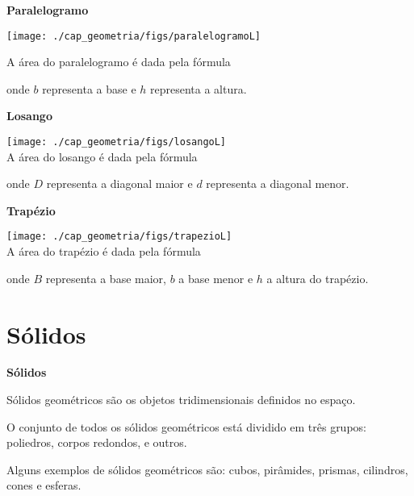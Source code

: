 \textbf{Paralelogramo}
\begin{multicols}{2}
\texttt{[image: ./cap\_geometria/figs/paralelogramoL]}

A área do paralelogramo é dada pela fórmula


onde $b$ representa a base e $h$ representa a altura.
\end{multicols}

\newpage

\textbf{Losango}
\begin{multicols}{2}
\texttt{[image: ./cap\_geometria/figs/losangoL]} \\
A área do losango é dada pela fórmula


onde $D$ representa a diagonal maior e $d$ representa a diagonal menor.
\end{multicols}

\textbf{Trapézio}
\begin{multicols}{2}
\texttt{[image: ./cap\_geometria/figs/trapezioL]} \\
A área do trapézio é dada pela fórmula


onde $B$ representa a base maior, $b$ a base menor e $h$ a altura do trapézio.
\end{multicols}

\section{Sólidos}

\vskip0.3cm

\colorbox{azul}{
 \begin{minipage}{0.9\linewidth}
 \begin{center}
 \textbf{Sólidos}

  Sólidos geométricos são os objetos tridimensionais definidos no espaço.

  O conjunto de todos os sólidos geométricos está dividido em três grupos: poliedros, corpos redondos, e outros.

 \end{center}
 \end{minipage}}

 \vskip0.3cm

 Alguns exemplos de sólidos geométricos são: cubos, pirâmides, prismas, cilindros, cones e esferas.



